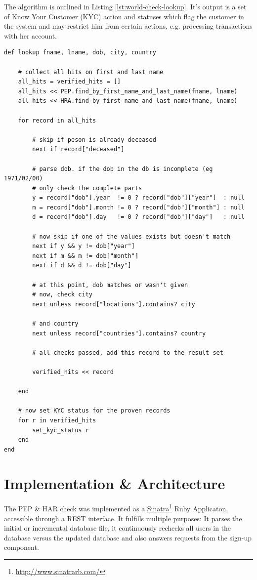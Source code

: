 \documentclass[a4paper, oneside]{csthesis}
\newcommand\fnurl[2]{%
  \href{#2}{#1}\footnote{\url{#2}}%
}
\begin{document}
The algorithm is outlined in Listing \ref{lst:world-check-lookup}. It's output is a set of Know Your Customer (KYC) action and statuses which flag the customer in the system and may restrict him from certain actions, e.g. processing transactions with her account.

\begin{lstlisting}[caption={The Lookup algorithm},label={lst:world-check-lookup}]
def lookup fname, lname, dob, city, country

    # collect all hits on first and last name
    all_hits = verified_hits = []
    all_hits << PEP.find_by_first_name_and_last_name(fname, lname)
    all_hits << HRA.find_by_first_name_and_last_name(fname, lname)

    for record in all_hits

        # skip if peson is already deceased
        next if record["deceased"]

        # parse dob. if the dob in the db is incomplete (eg 1971/02/00)
        # only check the complete parts
        y = record["dob"].year  != 0 ? record["dob"]["year"]  : null
        m = record["dob"].month != 0 ? record["dob"]["month"] : null
        d = record["dob"].day   != 0 ? record["dob"]["day"]   : null

        # now skip if one of the values exists but doesn't match
        next if y && y != dob["year"]
        next if m && m != dob["month"]
        next if d && d != dob["day"]

        # at this point, dob matches or wasn't given
        # now, check city
        next unless record["locations"].contains? city

        # and country
        next unless record["countries"].contains? country

        # all checks passed, add this record to the result set

        verified_hits << record

    end

    # now set KYC status for the proven records
    for r in verified_hits
        set_kyc_status r
    end
end
\end{lstlisting}


\section{Implementation \& Architecture}

The PEP \& HAR check was implemented as a \fnurl{Sinatra}{http://www.sinatrarb.com/} Ruby Applicaton, accessible through a REST interface. It fulfills multiple purposes: It parses the initial or incremental database file, it continuously rechecks all users in the database versus the updated database and also answers requests from the sign-up component.
\end{document}
